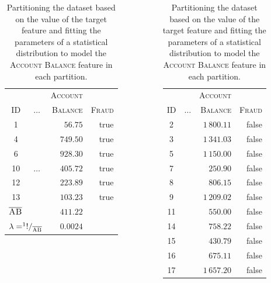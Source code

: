 \documentclass[xcolor={table}]{beamer}
\newcommand{\featN}[1]{\textsc{#1}}
\begin{document}
 \begin{frame} [plain]
\begin{table}[!tb]
\caption{Partitioning the dataset based on the value of the target feature and fitting the parameters of a statistical distribution to model the \featN{Account Balance} feature in each partition.}
\label{table:exfittingdistributions}
\centering
\begin{footnotesize}
\begin{columns}
\begin{column}{0.5\textwidth}
\begin{tabular}{ccrr}
\hline
~ & ~ & \featN{Account} & ~\\
\featN{ID} & $\dots$ & \featN{Balance} & \featN{Fraud}\\
\hline
1 & ~ & $56.75$ & true\\
4 & 	~ & 	$749.50$ &true\\
6 & 	~ & 	$928.30$ &true\\
10 & 	$\dots$ & 	$405.72$ &true\\
12 & 	~ & 	$223.89$ &true\\
13 & 	~ & 	$103.23$ &true\\
\hline
\multicolumn{2}{l}{$\overline{\featN{AB}}$} & $411.22$ & ~\\
\multicolumn{2}{l}{$\lambda=^{1}!/_{\overline{\featN{AB}}}$} & $0.0024$ & ~ \\
\hline
\end{tabular}
\end{column} 
\begin{column}{0.5\textwidth}
\begin{tabular}{ccrr}
\hline
~ & ~ & \featN{Account} & ~\\
\featN{ID} & $\dots$ & \featN{Balance} & \featN{Fraud}\\
\hline
2 & 	~ & 	$1\,800.11$ &false\\
3 & 	~ & 	$1\,341.03$ &false\\
5 & 	~ & 	$1\,150.00$ &false\\
7 & 	~ & 	$250.90$ &false\\
8 & 	~ & 	$806.15$ &false\\
9 & 	~ & 	$1\,209.02$ &false\\
11 & 	~ & 	$550.00$ &false\\
14 & 	~ & 	$758.22$ &false\\
15 & 	~ & 	$430.79$ &false\\
16 & 	~ & 	$675.11$ &false\\
17 & 	~ & 	$1\,657.20$ &false\\

\end{tabular}
\end{column}
\end{columns}
\end{footnotesize}
\end{table}
\end{frame}
\end{document}
